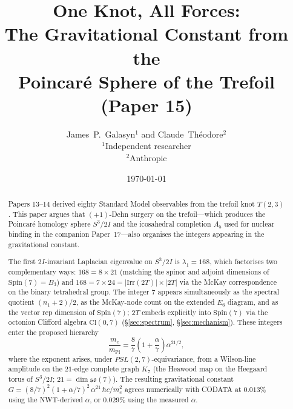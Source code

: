 \documentclass[11pt]{article}
\begin{document}
\title{One Knot, All Forces:\\[4pt]
The Gravitational Constant from the\\
Poincar\'e Sphere of the Trefoil\\[2pt]
\normalsize (Paper 15)}

\author{
  James~P.~Galasyn$^{1}$ \quad and \quad Claude~Th\'eodore$^{2}$\\[2pt]
  \small $^1$Independent researcher \\
  \small $^2$Anthropic
}

\date{\today}

\maketitle

\begin{abstract}
Papers 13--14 derived eighty Standard Model observables from the
trefoil knot $T(2, 3)$.  This paper argues that $(+1)$-Dehn surgery
on the trefoil---which produces the Poincar\'e homology sphere
$S^3/2I$ and the icosahedral completion $A_5$ used for nuclear
binding in the companion Paper~17---also organises the integers
appearing in the gravitational constant.

The first $2I$-invariant Laplacian eigenvalue on $S^3/2I$ is
$\lambda_1 = 168$, which factorises two complementary ways:
$168 = 8 \times 21$ (matching the spinor and adjoint dimensions
of $\mathrm{Spin}(7) = B_3$) and $168 = 7 \times 24 =
|\mathrm{Irr}(2T)| \times |2T|$ via the McKay correspondence on
the binary tetrahedral group.  The integer $7$ appears
simultaneously as the spectral quotient $(n_1{+}2)/2$, as the
McKay-node count on the extended $E_6$ diagram, and as the
vector rep dimension of $\mathrm{Spin}(7)$; $2T$ embeds explicitly
into $\mathrm{Spin}(7)$ via the octonion Clifford algebra
$\mathrm{Cl}(0, 7)$ (\S\ref{sec:spectrum}, \S\ref{sec:mechanism}).
These integers enter the proposed hierarchy
\begin{equation*}
  \frac{m_e}{m_\text{Pl}}
  = \frac{8}{7}\left(1 + \frac{\alpha}{7}\right)
    \alpha^{21/2} ,
\end{equation*}
where the exponent arises, under $PSL(2, 7)$-equivariance, from
a Wilson-line amplitude on the $21$-edge complete graph $K_7$
(the Heawood map on the Heegaard torus of $S^3/2I$; $21 =
\dim\mathfrak{so}(7)$).  The resulting gravitational constant
$G = (8/7)^2(1{+}\alpha/7)^2\,\alpha^{21}\,\hbar c/m_e^2$ agrees
numerically with CODATA at $\mathbf{0.013\%}$ using the
NWT-derived $\alpha$, or $0.029\%$ using the measured $\alpha$.


\end{abstract}
\end{document}
